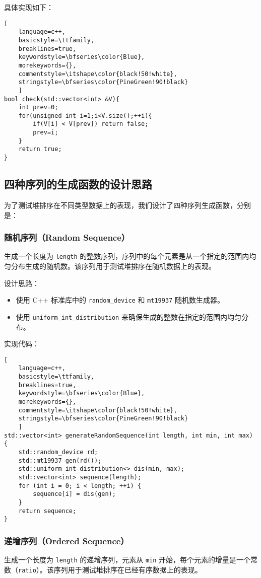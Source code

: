 \documentclass[UTF8]{ctexart}
\begin{document}
具体实现如下：
\begin{lstlisting}[ 
    language=c++,
    basicstyle=\ttfamily,
    breaklines=true,
    keywordstyle=\bfseries\color{Blue}, 
    morekeywords={}, 
    commentstyle=\itshape\color{black!50!white},
    stringstyle=\bfseries\color{PineGreen!90!black} 
    ]
bool check(std::vector<int> &V){
    int prev=0;
    for(unsigned int i=1;i<V.size();++i){
        if(V[i] < V[prev]) return false;
        prev=i;
    }
    return true;
}
\end{lstlisting}

\subsection{四种序列的生成函数的设计思路}
为了测试堆排序在不同类型数据上的表现，我们设计了四种序列生成函数，分别是：


\subsubsection{\textbf{随机序列（Random Sequence）}}

生成一个长度为 \texttt{length} 的整数序列，序列中的每个元素是从一个指定的范围内均匀分布生成的随机数。该序列用于测试堆排序在随机数据上的表现。

设计思路：
\begin{itemize}
    \item 使用 C++ 标准库中的 \texttt{random\_device} 和 \texttt{mt19937} 随机数生成器。
    \item 使用 \texttt{uniform\_int\_distribution} 来确保生成的整数在指定的范围内均匀分布。
\end{itemize}

实现代码：
\begin{lstlisting}[ 
    language=c++,
    basicstyle=\ttfamily,
    breaklines=true,
    keywordstyle=\bfseries\color{Blue}, 
    morekeywords={}, 
    commentstyle=\itshape\color{black!50!white},
    stringstyle=\bfseries\color{PineGreen!90!black} 
    ]
std::vector<int> generateRandomSequence(int length, int min, int max) {
    std::random_device rd;
    std::mt19937 gen(rd());
    std::uniform_int_distribution<> dis(min, max);
    std::vector<int> sequence(length);
    for (int i = 0; i < length; ++i) {
        sequence[i] = dis(gen);
    }
    return sequence;
}
\end{lstlisting}

\subsubsection{\textbf{递增序列（Ordered Sequence）}}
生成一个长度为 \texttt{length} 的递增序列，元素从 \texttt{min} 开始，每个元素的增量是一个常数（\texttt{ratio}）。该序列用于测试堆排序在已经有序数据上的表现。
\end{document}
